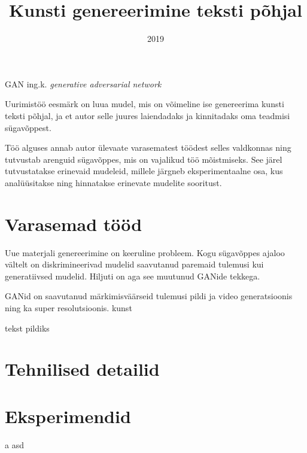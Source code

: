 \documentclass{vilgym}
\title{Kunsti genereerimine teksti põhjal}
\date{2019}
\begin{document}
    \maketitle
    \tableofcontents

    \begin{description}
		\let\originalitem\item
		\renewcommand*{\item}[1][]{\originalitem[#1]\label{def:#1}}

        \item{GAN} ing.k. \textit{generative adversarial network}
    \end{description}

	\newcommand*{\seedefinition}[1]{(\hyperref[def:#1]{vt~definitsiooni})}

    

    Uurimistöö eesmärk on luua mudel, mis on võimeline ise genereerima kunsti teksti põhjal, ja et autor selle juures laiendadaks ja kinnitadaks oma teadmisi sügavõppest.

    Töö alguses annab autor ülevaate varasematest töödest selles valdkonnas ning tutvustab arenguid sügavõppes, mis on vajalikud töö mõistmiseks. See järel tutvustatakse erinevaid mudeleid, millele järgneb eksperimentaalne osa, kus analüüsitakse ning hinnatakse erinevate mudelite sooritust. 
    
    \section{Varasemad tööd}
    Uue materjali genereerimine on keeruline probleem. Kogu sügavõppes ajaloo vältelt on diskrimineerivad mudelid saavutanud paremaid tulemusi kui generatiivsed mudelid. Hiljuti on aga see muutunud GANide tekkega.

    GANid on saavutanud märkimisväärseid tulemusi pildi ja video generatsioonis ning ka super resolutsioonis. kunst

    tekst pildiks

    \section{Tehnilised detailid}

    \section{Eksperimendid}

    a
    asd \parencite{cyclegan}

    \nocite{*} %
    \printbibliography[title={Kasutatud allikad}]
\end{document}
